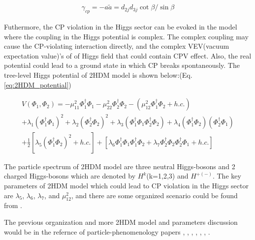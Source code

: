 			\begin{equation}
			\begin{split}
			\gamma_{cp} = -a \widetilde{a} = d_{2j}d_{3j}\cot{\beta}/\sin{\beta}
			\label{eq:2HDM_rawCPV}
			\end{split}
			\end{equation}
			\FloatBarrier

			Futhermore, the CP violation in the Higgs sector can be evoked in the model where the coupling in the Higgs potential is complex. The complex coupling may cause the CP-violating interaction directly, and the complex VEV(vacuum expectation value)'s of of Higgs field that could contain CPV effect. Also, the real potential could lead to a ground state in which CP breaks spontaneously. The tree-level Higgs potential of 2HDM model is shown below:(Eq.\ref{eq:2HDM_potential})

			\begin{equation}
			\begin{split}
			V(\Phi_1, \Phi_2) = -\mu^2_{11} \Phi^{\dagger}_{1}\Phi_{1} -\mu^2_{22} \Phi^{\dagger}_{2}\Phi_{2} - ( \mu^2_{12} \Phi^{\dagger}_{1}\Phi_{2} + h.c.) \\
			+ \lambda_1(\Phi^{\dagger}_{1}\Phi_{1})^2 + \lambda_2(\Phi^{\dagger}_{2}\Phi_{2})^2 + \lambda_3(\Phi^{\dagger}_{1}\Phi_{1}\Phi^{\dagger}_{2}\Phi_{2}) + \lambda_4(\Phi^{\dagger}_{1}\Phi_{2})(\Phi^{\dagger}_{2}\Phi_{1})\\
			+ \frac{1}{2}[\lambda_5(\Phi^{\dagger}_{1}\Phi_{2})^2 + h.c. ] + [ \lambda_6 \Phi^{\dagger}_{1}\Phi_{1}\Phi^{\dagger}_{1}\Phi_{2} + \lambda_7 \Phi^{\dagger}_{2}\Phi_{2}\Phi^{\dagger}_{2}\Phi_{1} + h.c.]
			\label{eq:2HDM_potential}
			\end{split}
			\end{equation}
			\FloatBarrier

			The particle spectrum of 2HDM model are three neutral Higgs-bosons and 2 charged Higgs-bosons which are denoted by $H^{k}$(k=1,2,3) and $H^{+(-)}$. The key parameters of 2HDM model which could lead to CP violation in the Higgs sector are $\lambda_5$, $\lambda_6$, $\lambda_7$, and $\mu_{12}^2$, and there are some organized scenario could be found from \cite{Atwood:2000tu}.

			The previous organization and more 2HDM model and parameters discussion would be in the refernce of particle-phenomenology papers \cite{Atwood:2000tu}, \cite{ElKaffas:2006gdt}, \cite{Khater:2003wq}, \cite{Keus:2015hva}, \cite{Iguro:2019zlc}, \cite{Bernreuther:1993hq}, \cite{Bernreuther:1998qv}. 

